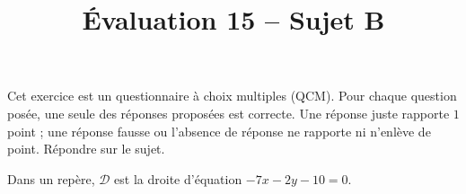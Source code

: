 \documentclass[a4paper]{article}
\begin{document}
\title{Évaluation 15 -- Sujet B}

\pagestyle{empty}

\date{}
\author{}

\maketitle{}

\thispagestyle{empty}

\exo[6 points] Cet exercice est un questionnaire à choix multiples (QCM). Pour chaque question posée, une seule des réponses proposées est correcte. Une réponse juste rapporte $1$ point ; une réponse fausse ou l'absence de réponse ne rapporte ni n'enlève de point. Répondre sur le sujet.

\medskip

Dans un repère, $\mathcal{D}$ est la droite d'équation $-7x-2y-10=0$.
\end{document}
